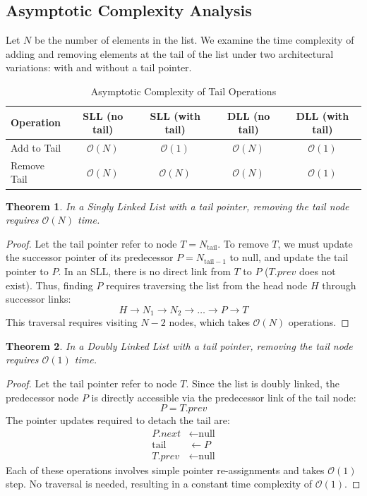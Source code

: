 \documentclass[10pt,journal,compsoc,onecolumn]{IEEEtran}
\newtheorem{theorem}{Theorem}
\begin{document}
\subsection{Asymptotic Complexity Analysis}
Let $N$ be the number of elements in the list. We examine the time complexity of adding and removing elements at the tail of the list under two architectural variations: with and without a tail pointer.

\begin{table}[h]
\centering
\caption{Asymptotic Complexity of Tail Operations}
\label{tab:tail_complexities}
\begin{tabular}{@{}lcccc@{}}
\toprule
\textbf{Operation} & \textbf{SLL (no tail)} & \textbf{SLL (with tail)} & \textbf{DLL (no tail)} & \textbf{DLL (with tail)} \\ \midrule
Add to Tail & $\mathcal{O}(N)$ & $\mathcal{O}(1)$ & $\mathcal{O}(N)$ & $\mathcal{O}(1)$ \\
Remove Tail & $\mathcal{O}(N)$ & $\mathcal{O}(N)$ & $\mathcal{O}(N)$ & $\mathcal{O}(1)$ \\ \bottomrule
\end{tabular}
\end{table}

\begin{theorem}
In a Singly Linked List with a tail pointer, removing the tail node requires $\mathcal{O}(N)$ time.
\end{theorem}
\begin{proof}
Let the tail pointer refer to node $T = N_{\text{tail}}$. To remove $T$, we must update the successor pointer of its predecessor $P = N_{\text{tail}-1}$ to $\text{null}$, and update the tail pointer to $P$. In an SLL, there is no direct link from $T$ to $P$ ($T.\textit{prev}$ does not exist). Thus, finding $P$ requires traversing the list from the head node $H$ through successor links:
\[
H \to N_1 \to N_2 \to \ldots \to P \to T
\]
This traversal requires visiting $N - 2$ nodes, which takes $\mathcal{O}(N)$ operations.
\end{proof}

\begin{theorem}
In a Doubly Linked List with a tail pointer, removing the tail node requires $\mathcal{O}(1)$ time.
\end{theorem}
\begin{proof}
Let the tail pointer refer to node $T$. Since the list is doubly linked, the predecessor node $P$ is directly accessible via the predecessor link of the tail node:
\[
P = T.\textit{prev}
\]
The pointer updates required to detach the tail are:
\begin{align*}
P.\textit{next} &\leftarrow \text{null} \\
\text{tail} &\leftarrow P \\
T.\textit{prev} &\leftarrow \text{null}
\end{align*}
Each of these operations involves simple pointer re-assignments and takes $\mathcal{O}(1)$ step. No traversal is needed, resulting in a constant time complexity of $\mathcal{O}(1)$.
\end{proof}
\end{document}
